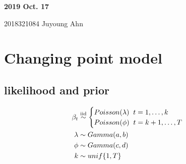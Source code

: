\documentclass[11pt]{article}
\begin{document}
	
	
	
	\newcommand{\Ito}{$It\hat{o}$'$s~Lemma$}
	
	\newcommand\ind{\stackrel{\rm ind}{\sim}}
	\newcommand\iid{\stackrel{\rm iid}{\sim}}
	\renewcommand\c{\mathbf{c}}
	\newcommand\y{\mathbf{y}}
	\newcommand\z{\mathbf{z}}
	\renewcommand\P{\mathbf{P}}
	\newcommand\W{\mathbf{W}}
	\newcommand\X{\mathbf{X}}
	\newcommand\Y{\mathbf{Y}}
	\newcommand\Z{\mathbf{Z}}
	\newcommand\J{{\cal J}}
	\newcommand\B{{\cal B}}
	\newcommand\K{{\cal K}}
	\newcommand\N{{\rm N}}
	\newcommand\bs{\boldsymbol}
	\newcommand\bth{\bs\theta}
	\newcommand\bbe{\bs\beta}
	\renewcommand\*{^\star}
	\newcommand{\notimplies}{%
		\mathrel{{\ooalign{\hidewidth$\not\phantom{=}$\hidewidth\cr$\implies$}}}}
	
	\def\spacingset#1{\renewcommand{\baselinestretch}%
		{#1}\small\normalsize} \spacingset{1}
	
	
	
	\bigskip
	\bigskip
	\bigskip
	\begin{center}
		{\LARGE\bf 2019 Oct. 17 }
	\end{center}
	\begin{center}
		2018321084 Juyoung Ahn
	\end{center}
	\medskip
	
	
	
	\spacingset{1.45}
	\section{Changing point model}
	\subsection{likelihood and prior}
	\begin{align*}
	\beta_t &\iid \begin{cases}
	 Poisson(\lambda)\;\; t= 1, \dots ,k \\
	 Poisson(\phi) \;\; t= k+1, \dots ,T
	\end{cases}\\
	\lambda &\sim Gamma(a,b)\\
	\phi &\sim Gamma(c,d)\\
	k &\sim unif\{1, T\}
	\end{align*}
\end{document}
